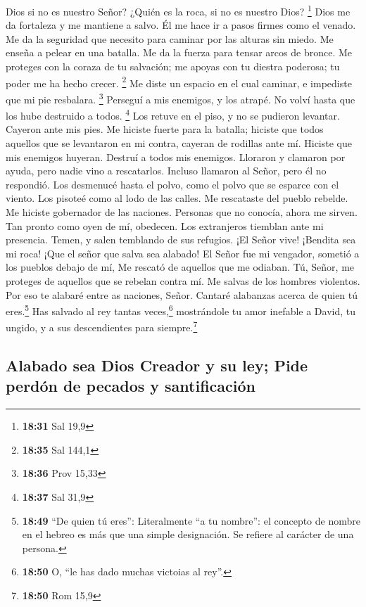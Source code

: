 Dios si no es nuestro Señor? ¿Quién es la roca, si no es nuestro Dios?
\footnote{\textbf{18:31} Sal 19,9}  Dios me da fortaleza
y me mantiene a salvo.  Él me hace ir a pasos firmes como
el venado. Me da la seguridad que necesito para caminar por las alturas
sin miedo.  Me enseña a pelear en una batalla. Me da la
fuerza para tensar arcos de bronce.  Me proteges con la
coraza de tu salvación; me apoyas con tu diestra poderosa; tu poder me
ha hecho crecer. \footnote{\textbf{18:35} Sal 144,1}  Me
diste un espacio en el cual caminar, e impediste que mi pie resbalara.
\footnote{\textbf{18:36} Prov 15,33}  Perseguí a mis
enemigos, y los atrapé. No volví hasta que los hube destruido a todos.
\footnote{\textbf{18:37} Sal 31,9}  Los retuve en el
piso, y no se pudieron levantar. Cayeron ante mis pies. 
Me hiciste fuerte para la batalla; hiciste que todos aquellos que se
levantaron en mi contra, cayeran de rodillas ante mí. 
Hiciste que mis enemigos huyeran. Destruí a todos mis enemigos.
 Lloraron y clamaron por ayuda, pero nadie vino a
rescatarlos. Incluso llamaron al Señor, pero él no respondió.
 Los desmenucé hasta el polvo, como el polvo que se
esparce con el viento. Los pisoteé como al lodo de las calles.
 Me rescataste del pueblo rebelde. Me hiciste gobernador
de las naciones. Personas que no conocía, ahora me sirven.
 Tan pronto como oyen de mí, obedecen. Los extranjeros
tiemblan ante mi presencia.  Temen, y salen temblando de
sus refugios.  ¡El Señor vive! ¡Bendita sea mi roca! ¡Que
el señor que salva sea alabado!  El Señor fue mi
vengador, sometió a los pueblos debajo de mí,  Me rescató
de aquellos que me odiaban. Tú, Señor, me proteges de aquellos que se
rebelan contra mí. Me salvas de los hombres violentos. 
Por eso te alabaré entre as naciones, Señor. Cantaré alabanzas acerca de
quien tú eres.\footnote{\textbf{18:49} ``De quien tú eres'':
  Literalmente ``a tu nombre'': el concepto de nombre en el hebreo es
  más que una simple designación. Se refiere al carácter de una persona.}
 Has salvado al rey tantas veces,\footnote{\textbf{18:50}
  O, ``le has dado muchas victoias al rey''.} mostrándole tu amor
inefable a David, tu ungido, y a sus descendientes para
siempre.\footnote{\textbf{18:50} Rom 15,9}

\hypertarget{alabado-sea-dios-creador-y-su-ley-pide-perduxf3n-de-pecados-y-santificaciuxf3n}{%
\subsection{Alabado sea Dios Creador y su ley; Pide perdón de pecados y
santificación}\label{alabado-sea-dios-creador-y-su-ley-pide-perduxf3n-de-pecados-y-santificaciuxf3n}}

